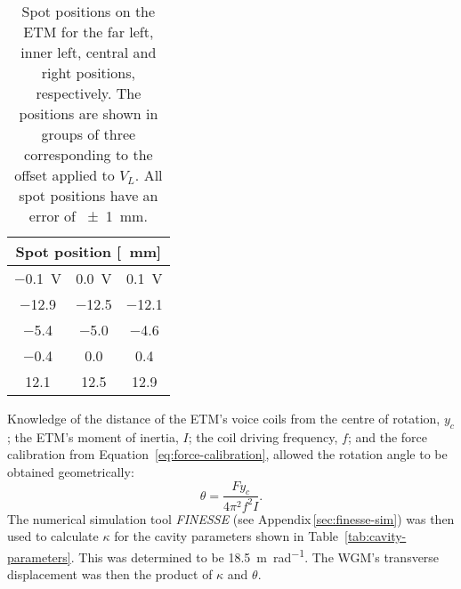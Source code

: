 \begin{table}
  \centering
  \begin{tabular}{|c|c|c|}
    \hline
    \multicolumn{3}{|c|}{\textbf{Spot position [\SI{}{\milli \meter}]}} \\ \hline
    \SI{-0.1}{\volt} & \SI{0.0}{\volt} & \SI{+0.1}{\volt}               \\ \hline\hline
    \num{-12.9} & \num{-12.5} & \num{-12.1}                             \\ \hline
    \num{-5.4} & \num{-5.0} & \num{-4.6}                                \\ \hline
    \num{-0.4} & \num{0.0} & \num{0.4}                                  \\ \hline
    \num{12.1} & \num{12.5} & \num{12.9}                                \\ \hline
  \end{tabular}
  \caption[Spot positions on the end test mass]{\label{tab:spot-positions}Spot positions on the \gls{ETM} for the far left, inner left, central and right positions, respectively. The positions are shown in groups of three corresponding to the offset applied to $V_L$. All spot positions have an error of \SI{\pm1}{\milli\meter}.}
\end{table}

Knowledge of the distance of the \gls{ETM}'s voice coils from the centre of rotation, $y_c$; the \gls{ETM}'s moment of inertia, $I$; the coil driving frequency, $f$; and the force calibration from Equation~\ref{eq:force-calibration}, allowed the rotation angle to be obtained geometrically:
\begin{equation}
  \theta = \frac{F y_c}{4 \pi^2 f^2 I}.
  \label{eq:rotation-calibration}
\end{equation}
The numerical simulation tool \emph{\gls{FINESSE}} (see Appendix\,\ref{sec:finesse-sim}) was then used to calculate $\kappa$ for the cavity parameters shown in Table~\ref{tab:cavity-parameters}. This was determined to be \SI{18.5}{\meter \per \radian}. The \gls{WGM}'s transverse displacement was then the product of $\kappa$ and $\theta$.

